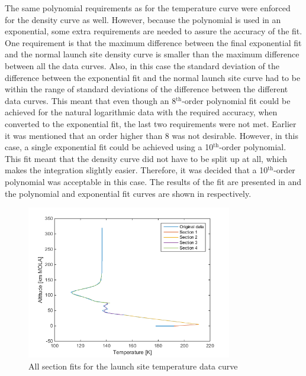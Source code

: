 \noindent
The same polynomial requirements as for the temperature curve were enforced for the density curve as well. However, because the polynomial is used in an exponential, some extra requirements are needed to assure the accuracy of the fit. One requirement is that the maximum difference between the final exponential fit and the normal launch site density curve is smaller than the maximum difference between all the data curves. Also, in this case the standard deviation of the difference between the exponential fit and the normal launch site curve had to be within the range of standard deviations of the difference between the different data curves. This meant that even though an 8$^{\text{th}}$-order polynomial fit could be achieved for the natural logarithmic data with the required accuracy, when converted to the exponential fit, the last two requirements were not met. Earlier it was mentioned that an order higher than 8 was not desirable. However, in this case, a single exponential fit could be achieved using a 10$^\text{th}$-order polynomial. This fit meant that the density curve did not have to be split up at all, which makes the integration slightly easier. Therefore, it was decided that a 10$^\text{th}$-order polynomial was acceptable in this case. The results of the fit are presented in  and the polynomial and exponential fit curves are shown in  respectively.

%


\begin{figure}[H]
\centering
\includegraphics[width=0.8\textwidth]{figures/software/completePolyFitTempSplit5.png}
\caption{All section fits for the launch site temperature data curve}
\label{fig:completePolyFitTempSplit5}
\end{figure}






